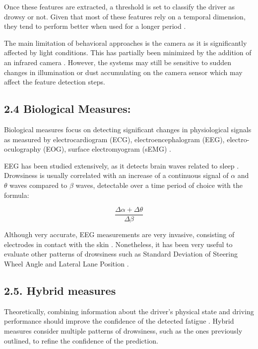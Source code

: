 \documentclass[a4paper]{article}
\begin{document}
Once these features are extracted, a threshold is set to classify the
driver as drowsy or not. Given that most of these features rely on a
temporal dimension, they tend to perform better when used for a longer
period \cite{wilkinson_accuracy_2013}.

The main limitation of behavioral approaches is the camera as it is
significantly affected by light conditions. This has partially been
minimized by the addition of an infrared camera
\cite{sahayadhas_detecting_2012}. However, the systems may still be
sensitive to sudden changes in illumination or dust accumulating on the
camera sensor which may affect the feature detection steps.

\hypertarget{biological-measures}{%
\subsection{2.4 Biological Measures:}\label{biological-measures}}

Biological measures focus on detecting significant changes in
physiological signals as measured by electrocardiogram (ECG),
electroencephalogram (EEG), electro-oculography (EOG), surface
electromyogram (sEMG) \cite{dong_driver_2011}.

EEG has been studied extensively, as it detects brain waves related to
sleep \cite{qiong_wang_driver_2006}. Drowsiness is usually correlated
with an increase of a continuous signal of \(\alpha\) and \(\theta\)
waves compared to \(\beta\) waves, detectable over a time period of choice with the formula:

\[ \dfrac{\Delta \alpha + \Delta \theta}{\Delta \beta} \]

Although very accurate, EEG measurements are very invasive, consisting
of electrodes in contact with the skin \cite{dong_driver_2011}.
Nonetheless, it has been very useful to evaluate other patterns of
drowsiness such as Standard Deviation of Steering Wheel Angle and
Lateral Lane Position \cite{boyle_driver_2008}.

\hypertarget{hybrid-measures}{%
\subsection{2.5. Hybrid measures}\label{hybrid-measures}}

Theoretically, combining information about the driver's physical state
and driving performance should improve the confidence of the detected
fatigue \cite{dong_driver_2011}. Hybrid measures consider multiple
patterns of drowsiness, such as the ones previously outlined, to refine
the confidence of the prediction.
\end{document}

